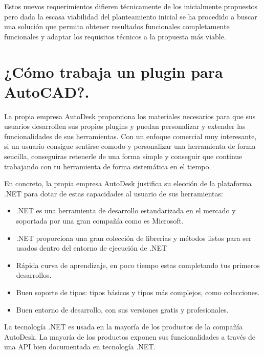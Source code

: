 Estos nuevos requerimientos difieren técnicamente de los inicialmente propuestos pero dada la escasa viabilidad del planteamiento inicial se ha procedido a buscar una solución que permita obtener resultados funcionales completamente funcionales y adaptar los requisitos técnicos a la propuesta más viable.

\section{¿Cómo trabaja un plugin para AutoCAD?.}

La propia empresa AutoDesk proporciona los materiales necesarios para que sus usuarios desarrollen sus propios plugins y puedan personalizar y extender las funcionalidades de sus herramientas. Con un enfoque comercial muy interesante, si un usuario consigue sentirse comodo y personalizar una herramienta de forma sencilla, conseguiras retenerle de una forma simple y conseguir que continue trabajando con tu herramienta de forma sistemática en el tiempo.

En concreto, la propia empresa AutoDesk justifica su elección de la plataforma .NET para dotar de estas capacidades al usuario de sus herramientas:

\begin{itemize}

\item{.NET es una herramienta de desarrollo estandarizada en el mercado y soportada por una gran compañía como es Microsoft.}

\item{.NET proporciona una gran colección de librerias y métodos listos para ser usados dentro del entorno de ejecución de .NET}

\item{Rápida curva de aprendizaje, en poco tiempo estas completando tus primeros desarrollos.}

\item{Buen soporte de tipos: tipos básicos y tipos más complejos, como colecciones.}

\item{Buen entorno de desarrollo, con sus versiones gratis y profesionales.}

\end{itemize}

La tecnología .NET es usada en la mayoría de los productos de la compañía AutoDesk. La mayoría de los productos exponen sus funcionalidades a través de una API bien documentada en tecnología .NET.

